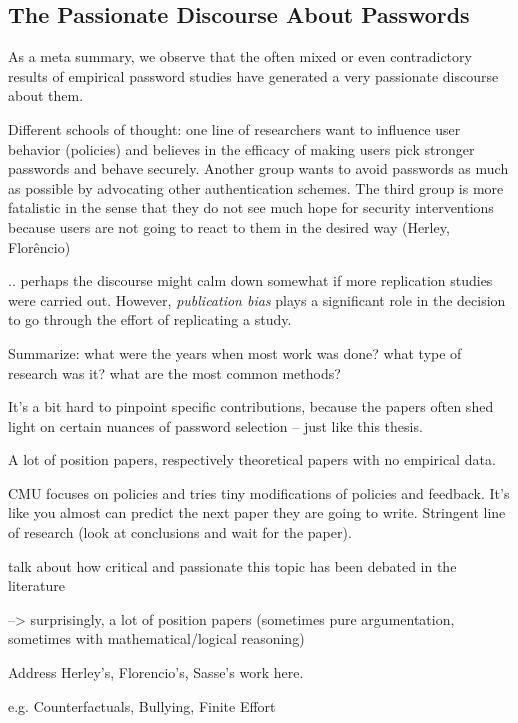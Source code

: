 \subsection*{The Passionate Discourse About Passwords}\label{sec:rw:passionate_discourse}
As a meta summary, we observe that the often mixed or even contradictory results of empirical password studies have generated a very passionate discourse about them. 

Different schools of thought: one line of researchers want to influence user behavior (policies) and believes in the efficacy of making users pick stronger passwords and behave securely. Another group wants to avoid passwords as much as possible by advocating other authentication schemes. The third group is more fatalistic in the sense that they do not see much hope for security interventions because users are not going to react to them in the desired way (Herley, Florêncio)

.. perhaps the discourse might calm down somewhat if more replication studies were carried out. However, \textit{publication bias} plays a significant role in the decision to go through the effort of replicating a study. 


Summarize: what were the years when most work was done? what type of research was it? what are the most common methods?

It's a bit hard to pinpoint specific contributions, because the papers often shed light on certain nuances of password selection -- just like this thesis.

A lot of position papers, respectively theoretical papers with no empirical data.

CMU focuses on policies and tries tiny modifications of policies and feedback. It's like you almost can predict the next paper they are going to write. Stringent line of research (look at conclusions and wait for the paper).


talk about how critical and passionate this topic has been debated in the literature

--> surprisingly, a lot of position papers (sometimes pure argumentation, sometimes with mathematical/logical reasoning) 

Address Herley's, Florencio's, Sasse's work here. 

e.g. Counterfactuals, Bullying, Finite Effort 


